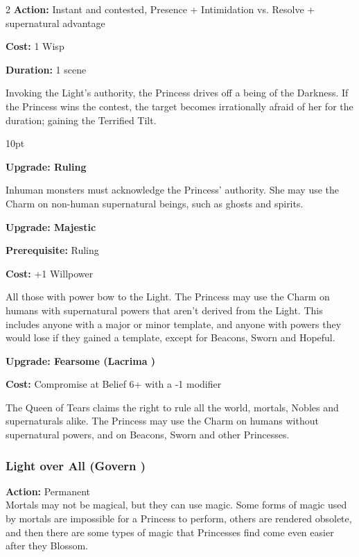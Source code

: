 \begin{multicols}{2}
\noindent \textbf{Action:} Instant and contested, Presence + Intimidation vs. Resolve + supernatural advantage

\noindent \textbf{Cost:} 1 Wisp

\noindent \textbf{Duration:} 1 scene

\noindent Invoking the Light's authority, the Princess drives off a being of the Darkness. If the Princess wins the contest, the target becomes irrationally afraid of her for the duration; gaining the Terrified Tilt.

\begin{myindentpar}{10pt}

\textbf{Upgrade: Ruling}

Inhuman monsters must acknowledge the Princess' authority. She may use the Charm on non-human supernatural beings, such as ghosts and spirits.

\textbf{Upgrade: Majestic}

\noindent \textbf{Prerequisite:} Ruling

\noindent \textbf{Cost:} +1 Willpower

All those with power bow to the Light. The Princess may use the Charm on humans with supernatural powers that aren't derived from the Light. This includes anyone with a major or minor template, and anyone with powers they would lose if they gained a template, except for Beacons, Sworn and Hopeful.

\textbf{Upgrade: Fearsome (Lacrima \textbullet\textbullet)}

\noindent \textbf{Cost:} Compromise at Belief 6+ with a -1 modifier

The Queen of Tears claims the right to rule all the world, mortals, Nobles and supernaturals alike. The Princess may use the Charm on humans without supernatural powers, and on Beacons, Sworn and other Princesses.\end{myindentpar}



\subsubsection*{Light over All (Govern \textbullet\textbullet)}

\noindent \textbf{Action:} Permanent \\

\noindent Mortals may not be magical, but they can use magic. Some forms of magic used by mortals are impossible for a Princess to perform, others are rendered obsolete, and then there are some types of magic that Princesses find come even easier after they Blossom. 


\end{multicols}
